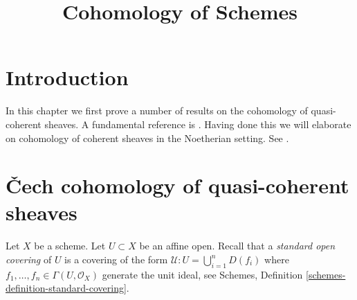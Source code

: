 

%


\title{Cohomology of Schemes}


\maketitle

\label{section-phantom}

\tableofcontents

\section{Introduction}
\label{section-introduction}

\noindent
In this chapter we first prove a number of results on the cohomology of
quasi-coherent sheaves. A fundamental reference is \cite{EGA}.
Having done this we will elaborate on cohomology of
coherent sheaves in the Noetherian setting. See \cite{FAC}.







\section{{\v C}ech cohomology of quasi-coherent sheaves}
\label{section-cech-quasi-coherent}

\noindent
Let $X$ be a scheme.
Let $U \subset X$ be an affine open.
Recall that a {\it standard open covering} of $U$ is a covering
of the form $\mathcal{U} : U = \bigcup_{i = 1}^n D(f_i)$
where $f_1, \ldots, f_n \in \Gamma(U, \mathcal{O}_X)$ generate
the unit ideal, see
Schemes, Definition \ref{schemes-definition-standard-covering}.


